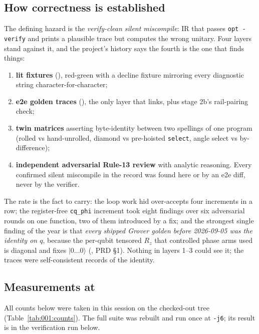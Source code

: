 \subsection*{How correctness is established}
The defining hazard is the \emph{verify-clean silent miscompile}: IR that passes \texttt{opt -verify}
and prints a plausible trace but computes the wrong unitary. Four layers stand against it, and the
project's history says the fourth is the one that finds things:
\begin{enumerate}
  \item \textbf{lit fixtures} (), red-green with a decline fixture mirroring
    every diagnostic string character-for-character;
  \item \textbf{e2e golden traces} (), the only layer that links, plus stage 2b's
    rail-pairing check;
  \item \textbf{twin matrices} asserting byte-identity between two spellings of one program
    (rolled vs hand-unrolled, diamond vs pre-hoisted \texttt{select}, angle select vs by-difference);
  \item \textbf{independent adversarial Rule-13 review} with analytic reasoning. Every confirmed
    silent miscompile in the record was found here or by an e2e diff, never by the verifier.
\end{enumerate}
The rate is the fact to carry: the loop work hid over-accepts four increments in a row; the
register-free \texttt{cq\_phi} increment took eight findings over six adversarial rounds on one
function, two of them introduced by a fix; and the strongest single finding of the year is that
\emph{every shipped Grover golden before 2026-09-05 was the identity on \(q\)}, because the
per-qubit tensored \(R_z\) that controlled phase arms used is diagonal and fixes \(|0\ldots0\rangle\)
(, PRD \S1). Nothing in layers 1--3 could see it; the traces were self-consistent records
of the identity.

\subsection*{Measurements at }
All counts below were taken in this session on the checked-out tree (Table~\ref{tab:001:counts}).
The full suite was rebuilt and run once at \texttt{-j6}; its result is in the verification run
below.

